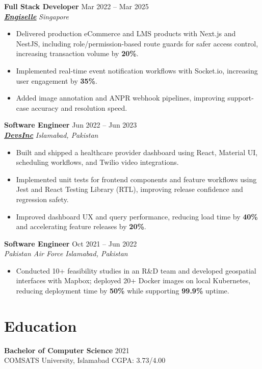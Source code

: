 \documentclass[9pt,letterpaper]{article}
\newcommand{\role}[4]{\textbf{#1} \hfill #2 \\
\textit{#3} \hfill \textit{#4}\\[-5pt]}
\begin{document}
\role{Full Stack Developer}{Mar 2022 -- Mar 2025}{\href{https://www.engiselle.com/}{\textbf{\underline{Engiselle}}}}{Singapore}
\begin{itemize}[leftmargin=*, itemsep=0pt, topsep=0pt, partopsep=0pt, parsep=0pt, after=\vspace{2pt}]
  \item Delivered production eCommerce and LMS products with Next.js and NestJS, including role/permission-based route guards for safer access control, increasing transaction volume by \textbf{20\%}.
  \item Implemented real-time event notification workflows with Socket.io, increasing user engagement by \textbf{35\%}.
  \item Added image annotation and ANPR webhook pipelines, improving support-case accuracy and resolution speed.
\end{itemize}

\role{Software Engineer}{Jun 2022 -- Jun 2023}{\href{https://www.devsinc.com/}{\textbf{\underline{DevsInc}}}}{Islamabad, Pakistan}
\begin{itemize}[leftmargin=*, itemsep=0pt, topsep=0pt, partopsep=0pt, parsep=0pt, after=\vspace{2pt}]
  \item Built and shipped a healthcare provider dashboard using React, Material UI, scheduling workflows, and Twilio video integrations.
  \item Implemented unit tests for frontend components and feature workflows using Jest and React Testing Library (RTL), improving release confidence and regression safety.
  \item Improved dashboard UX and query performance, reducing load time by \textbf{40\%} and accelerating feature releases by \textbf{20\%}.
\end{itemize}

\role{Software Engineer}{Oct 2021 -- Jun 2022}{Pakistan Air Force}{Islamabad, Pakistan}
\begin{itemize}[leftmargin=*, itemsep=0pt, topsep=0pt, partopsep=0pt, parsep=0pt, after=\vspace{2pt}]
  \item Conducted 10+ feasibility studies in an R\&D team and developed geospatial interfaces with Mapbox; deployed 20+ Docker images on local Kubernetes, reducing deployment time by \textbf{50\%} while supporting \textbf{99.9\%} uptime.
\end{itemize}

\section*{Education}
\textbf{Bachelor of Computer Science} \hfill 2021 \\
COMSATS University, Islamabad \hfill CGPA: 3.73/4.00
\end{document}
